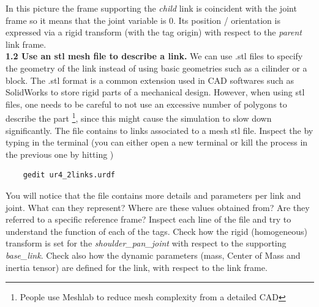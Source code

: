 \documentclass[11pt]{article}
\begin{document}
In this picture the frame supporting the \textit{child} link is coincident with the joint frame so it means that the joint variable is 0.
Its position / orientation is expressed via a rigid transform (with the tag origin) with  respect to the \textit{parent} link frame. 
\\



\textbf{1.2 Use an stl mesh file to describe a link.} We can use .stl files to specify the geometry of the link instead of using basic geometries such as a cilinder or a block. The .stl format is a common extension used in CAD softwares such as SolidWorks to store rigid parts of a mechanical design. However, when using stl files, one needs to be careful to not use an excessive number of polygons to describe the part \footnote{People use Meshlab to reduce mesh complexity from a detailed CAD}, since this might cause the simulation to slow down significantly. The file  contains to links associated to a mesh stl file. Inspect the  by typing in the terminal (you can either open a new terminal or kill the process in the previous one by hitting )
%
\begin{verbatim}
	gedit ur4_2links.urdf
\end{verbatim}
%
You will notice that the file contains more details and parameters per link and joint. What can they represent? Where are these values obtained from? Are they referred to a specific reference frame? Inspect each line of the file and try to understand the function of each 
of the tags. Check how the rigid (homogeneous) transform is set for the \textit{shoulder\_pan\_joint}  with respect to the supporting \textit{base\_link}. Check also how the dynamic parameters (mass, Center of Mass and inertia tensor) are defined for the link, with respect to the link frame.\\
\end{document}
